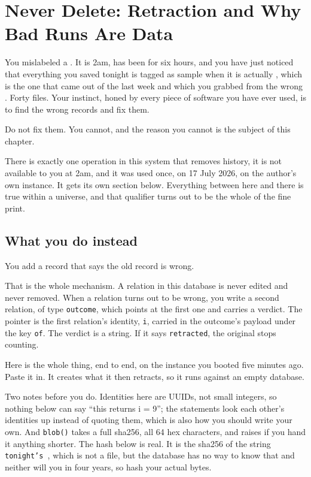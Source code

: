 \chapter{Never Delete: Retraction and Why Bad Runs Are Data}

You mislabeled a \labRun{}. It is 2am, \labColdSystemShort{} has been \labColdCondition{} for six hours, and you have just noticed that everything you saved tonight is tagged as sample \labSample{} when it is actually \labSampleAlt{}, which is the one that came out of the \labFabChamber{} last week and which you grabbed from the wrong \labSampleCarrier{}. Forty \labFileFormat{} files. Your instinct, honed by every piece of software you have ever used, is to find the wrong records and fix them.

Do not fix them. You cannot, and the reason you cannot is the subject of this chapter.

There is exactly one operation in this system that removes history, it is not available to you at 2am, and it was used once, on 17 July 2026, on the author's own instance. It gets its own section below. Everything between here and there is true within a universe, and that qualifier turns out to be the whole of the fine print.

\section{What you do instead}

You add a record that says the old record is wrong.

That is the whole mechanism. A relation in this database is never edited and never removed. When a relation turns out to be wrong, you write a second relation, of type \texttt{outcome}, which points at the first one and carries a verdict. The pointer is the first relation's identity, \texttt{i}, carried in the outcome's payload under the key \texttt{of}. The verdict is a string. If it says \texttt{retracted}, the original stops counting.

Here is the whole thing, end to end, on the instance you booted five minutes ago. Paste it in. It creates what it then retracts, so it runs against an empty database.

Two notes before you do. Identities here are UUIDs, not small integers, so nothing below can say ``this returns i = 9''; the statements look each other's identities up instead of quoting them, which is also how you should write your own. And \texttt{blob()} takes a full sha256, all 64 hex characters, and raises if you hand it anything shorter. The hash below is real. It is the sha256 of the string \texttt{tonight's \labScan}, which is not a \labFileFormat{} file, but the database has no way to know that and neither will you in four years, so hash your actual bytes.

